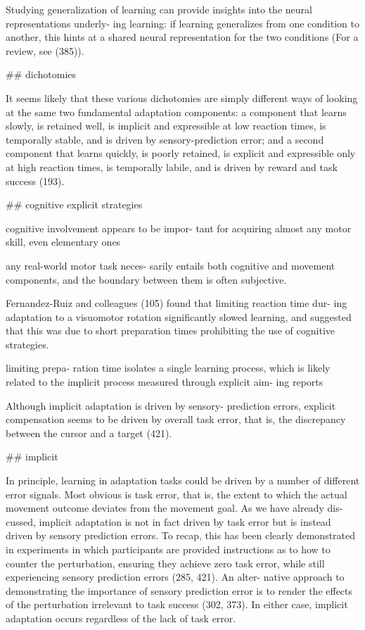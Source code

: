 \documentclass[../main.tex]{subfiles}
\begin{document}
{{Studying generalization of learning can provide insights into the neural representations underly- ing learning: if learning generalizes from one condition to another, this hints at a shared neural representation for the two conditions (For a review, see (385)).

## dichotomies

It seems likely that these various dichotomies are simply different ways of looking at the same two fundamental adaptation components: a component that learns slowly, is retained well, is implicit and expressible at low reaction times, is temporally stable, and is driven by sensory-prediction error; and a second component that learns quickly, is poorly retained, is explicit and expressible only at high reaction times, is temporally labile, and is driven by reward and task success (193).

## cognitive explicit strategies

cognitive involvement appears to be impor- tant for acquiring almost any motor skill, even elementary ones

any real-world motor task neces- sarily entails both cognitive and movement components, and the boundary between them is often subjective.

Fernandez-Ruiz and colleagues (105) found that limiting reaction time dur- ing adaptation to a visuomotor rotation significantly slowed learning, and suggested that this was due to short preparation times prohibiting the use of cognitive strategies.

limiting prepa- ration time isolates a single learning process, which is likely related to the implicit process measured through explicit aim- ing reports

Although implicit adaptation is driven by sensory- prediction errors, explicit compensation seems to be driven by overall task error, that is, the discrepancy between the cursor and a target (421).

## implicit

In principle, learning in adaptation tasks could be driven by a number of different error signals. Most obvious is task error, that is, the extent to which the actual movement outcome deviates from the movement goal. As we have already dis- cussed, implicit adaptation is not in fact driven by task error but is instead driven by sensory prediction errors. To recap, this has been clearly demonstrated in experiments in which participants are provided instructions as to how to counter the perturbation, ensuring they achieve zero task error, while still experiencing sensory prediction errors (285, 421). An alter- native approach to demonstrating the importance of sensory prediction error is to render the effects of the perturbation irrelevant to task success (302, 373). In either case, implicit adaptation occurs regardless of the lack of task error.

}}
\end{document}
